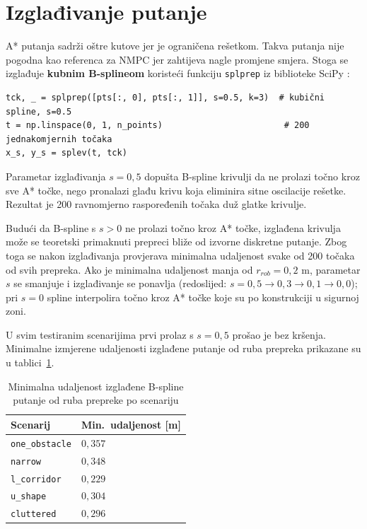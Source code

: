\section{Izglađivanje putanje}

A* putanja sadrži oštre kutove jer je ograničena rešetkom. Takva putanja nije pogodna kao referenca za NMPC jer zahtijeva nagle promjene smjera. Stoga se izglađuje \textbf{kubnim B-splineom} koristeći funkciju \texttt{splprep} iz biblioteke SciPy \cite{virtanen2020scipy}:

\begin{listing}[H]
\begin{verbatim}
tck, _ = splprep([pts[:, 0], pts[:, 1]], s=0.5, k=3)  # kubični spline, s=0.5
t = np.linspace(0, 1, n_points)                        # 200 jednakomjernih točaka
x_s, y_s = splev(t, tck)
\end{verbatim}
\caption{Izglađivanje putanje kubičnim splineom u \texttt{src/path\_smoother.py}}
\end{listing}

Parametar izglađivanja $s = 0{,}5$ dopušta B-spline krivulji da ne prolazi točno kroz sve A* točke, nego pronalazi glađu krivu koja eliminira sitne oscilacije rešetke. Rezultat je 200 ravnomjerno raspoređenih točaka duž glatke krivulje.

Budući da B-spline s $s > 0$ ne prolazi točno kroz A* točke, izglađena krivulja može se teoretski primaknuti prepreci bliže od izvorne diskretne putanje. Zbog toga se nakon izglađivanja provjerava minimalna udaljenost svake od 200 točaka od svih prepreka. Ako je minimalna udaljenost manja od $r_{rob} = 0{,}2$ m, parametar $s$ se smanjuje i izglađivanje se ponavlja (redoslijed: $s = 0{,}5 \to 0{,}3 \to 0{,}1 \to 0{,}0$); pri $s = 0$ spline interpolira točno kroz A* točke koje su po konstrukciji u sigurnoj zoni.

U svim testiranim scenarijima prvi prolaz s $s = 0{,}5$ prošao je bez kršenja. Minimalne izmjerene udaljenosti izglađene putanje od ruba prepreka prikazane su u tablici~\ref{tab:clearance}.

\begin{table}[H]
\centering
\caption{Minimalna udaljenost izglađene B-spline putanje od ruba prepreke po scenariju}
\label{tab:clearance}
\begin{tabular}{ll}
\toprule
Scenarij & Min.\ udaljenost [m] \\
\midrule
\texttt{one\_obstacle} & $0{,}357$ \\
\texttt{narrow}        & $0{,}348$ \\
\texttt{l\_corridor}   & $0{,}229$ \\
\texttt{u\_shape}      & $0{,}304$ \\
\texttt{cluttered}     & $0{,}296$ \\
\bottomrule
\end{tabular}
\end{table}


